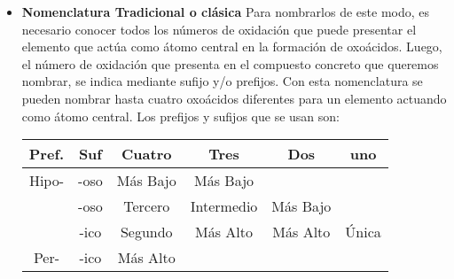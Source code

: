 \begin{itemize}
	\item \textbf{Nomenclatura Tradicional o clásica} Para nombrarlos de este modo, es necesario conocer todos los números de oxidación que
	puede presentar el elemento que actúa como átomo central en la formación de oxoácidos.
	Luego, el número de oxidación que presenta en el compuesto concreto que queremos
	nombrar, se indica mediante sufijo y/o prefijos. Con esta nomenclatura se pueden nombrar hasta cuatro oxoácidos diferentes para un elemento actuando como átomo central. Los prefijos y sufijos que se usan son:\\
	\begin{table} [h!]
		\centering
		\begin{tabular}{|c|c||c|c|c|c|} \hline
			Pref.&Suf&Cuatro&Tres&Dos&uno\\ \hline
			Hipo-&-oso&Más Bajo&Más Bajo&&\\ \hline
			&-oso&Tercero&Intermedio&Más Bajo&\\ \hline
			&-ico&Segundo&Más Alto&Más Alto&Única\\ \hline
			Per-&-ico&Más Alto&&&\\ \hline
		\end{tabular}
	

\end{table}
\end{itemize}

